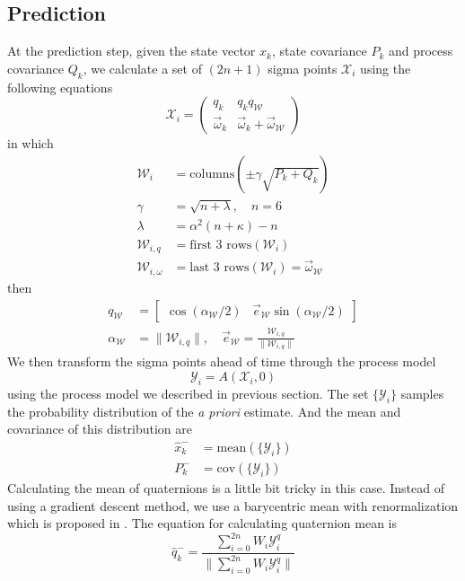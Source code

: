 \documentclass[twoside]{article}
\newcommand{\W}{\mathcal{W}}
\newcommand{\X}{\mathcal{X}}
\newcommand{\Y}{\mathcal{Y}}
\begin{document}
\begin{multicols}{2}
\subsection{Prediction}
At the prediction step, given the state vector $x_k$, state covariance $P_k$ and process covariance $Q_k$, we calculate a set of $(2n+1)$ sigma points $\X_i$ using the following equations
\begin{equation}
\X_i = \begin{pmatrix}q_k & q_k q_\W \\ \vec{\omega}_k & \vec{\omega}_k + \vec{\omega}_\W\end{pmatrix}
\end{equation}
in which
\begin{align}
\W_i          &= \mbox{columns}(\pm \gamma \sqrt{P_k + Q_k}) \\
\gamma        &= \sqrt{n+\lambda}, \quad n = 6 \\
\lambda       &= \alpha^2(n+\kappa) - n \\
\W_{i,q}      &= \mbox{first 3 rows}(\W_i) \\
\W_{i,\omega} &= \mbox{last 3 rows}(\W_i) = \vec{\omega}_\W
\end{align}
then
\begin{align}
q_\W &= \begin{bmatrix}\cos(\alpha_\W/2) & \vec{e}_\W \sin(\alpha_\W/2)\end{bmatrix} \\
\alpha_\W &= \|\W_{i,q}\|, \quad \vec{e}_\W = \frac{\W_{i,q}}{\|\W_{i,q}\|}
\end{align}
We then transform the sigma points ahead of time through the process model
\begin{equation}
\Y_i = A(\X_i,0)
\end{equation}
using the process model we described in previous section.
The set $\{\Y_i\}$ samples the probability distribution of the \textit{a priori} estimate. And the mean and covariance of this distribution are
\begin{align}
\hat{x}^-_k &= \mbox{mean}(\{\Y_i\}) \\
P^-_k &= \mbox{cov}(\{\Y_i\})
\end{align}
Calculating the mean of quaternions is a little bit tricky in this case. Instead of using a gradient descent method, we use a barycentric mean with renormalization which is proposed in \cite{Cheon07}. The equation for calculating quaternion mean is
\begin{equation}
\hat{q}^-_k = \frac{\sum^{2n}_{i=0}W_i \Y^q_i}{\|\sum^{2n}_{i=0}W_i \Y^q_i\|}

\end{equation}
\end{multicols}
\end{document}
